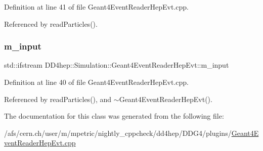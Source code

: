 Definition at line 41 of file Geant4\+Event\+Reader\+Hep\+Evt.\+cpp.



Referenced by read\+Particles().

\hypertarget{class_d_d4hep_1_1_simulation_1_1_geant4_event_reader_hep_evt_ac65db88522c8b307f04ae3ec193fbcb5}{}\label{class_d_d4hep_1_1_simulation_1_1_geant4_event_reader_hep_evt_ac65db88522c8b307f04ae3ec193fbcb5} 
\subsubsection{\texorpdfstring{m\+\_\+input}{m\_input}}
{\footnotesize\ttfamily std\+::ifstream D\+D4hep\+::\+Simulation\+::\+Geant4\+Event\+Reader\+Hep\+Evt\+::m\+\_\+input\hspace{0.3cm}{\ttfamily [protected]}}



Definition at line 40 of file Geant4\+Event\+Reader\+Hep\+Evt.\+cpp.



Referenced by read\+Particles(), and $\sim$\+Geant4\+Event\+Reader\+Hep\+Evt().



The documentation for this class was generated from the following file\+:\begin{DoxyCompactItemize}
\item 
/afs/cern.\+ch/user/m/mpetric/nightly\+\_\+cppcheck/dd4hep/\+D\+D\+G4/plugins/\hyperlink{_geant4_event_reader_hep_evt_8cpp}{Geant4\+Event\+Reader\+Hep\+Evt.\+cpp}\end{DoxyCompactItemize}
